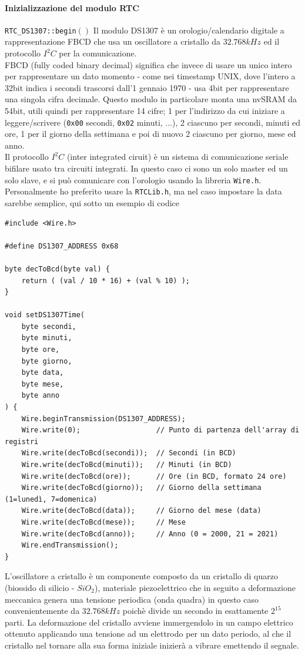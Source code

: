 \documentclass{article}
\begin{document}
    \paragraph{Inizializzazione del modulo RTC} \texttt{RTC\_DS1307::begin$()$} Il modulo DS1307 è un orologio/calendario digitale a rappresentazione FBCD che usa un oscillatore a cristallo da $32.768kHz$ ed il protocollo $I^{2}C$ per la comunicazione. \\
    FBCD (fully coded binary decimal) significa che invece di usare un unico intero per rappresentare un dato momento - come nei timestamp UNIX, dove l'intero a 32bit indica i secondi trascorsi dall'1 gennaio 1970 - usa 4bit per rappresentare una singola cifra decimale. Questo modulo in particolare monta una nvSRAM da 54bit, utili quindi per rappresentare 14 cifre; 1 per l'indirizzo da cui iniziare a leggere/scrivere (\texttt{0x00} secondi, \texttt{0x02} minuti, ...), 2 ciascuno per secondi, minuti ed ore, 1 per il giorno della settimana e poi di nuovo 2 ciascuno per giorno, mese ed anno. \\
    Il protocollo $I^{2}C$ (inter integrated ciruit) è un sistema di comunicazione seriale bifilare usato tra circuiti integrati. In questo caso ci sono un solo master ed un solo slave, e si può comunicare con l'orologio usando la libreria \texttt{Wire.h}. Personalmente ho preferito usare la \texttt{RTCLib.h}, ma nel caso impostare la data sarebbe semplice, qui sotto un esempio di codice
    \begin{verbatim}
#include <Wire.h>

#define DS1307_ADDRESS 0x68

byte decToBcd(byte val) {
    return ( (val / 10 * 16) + (val % 10) );
}

void setDS1307Time(
    byte secondi, 
    byte minuti, 
    byte ore, 
    byte giorno, 
    byte data, 
    byte mese, 
    byte anno
) {
    Wire.beginTransmission(DS1307_ADDRESS);
    Wire.write(0);                  // Punto di partenza dell'array di registri
    Wire.write(decToBcd(secondi));  // Secondi (in BCD)
    Wire.write(decToBcd(minuti));   // Minuti (in BCD)
    Wire.write(decToBcd(ore));      // Ore (in BCD, formato 24 ore)
    Wire.write(decToBcd(giorno));   // Giorno della settimana (1=lunedì, 7=domenica)
    Wire.write(decToBcd(data));     // Giorno del mese (data)
    Wire.write(decToBcd(mese));     // Mese
    Wire.write(decToBcd(anno));     // Anno (0 = 2000, 21 = 2021)
    Wire.endTransmission();
}
    \end{verbatim}
    L'oscillatore a cristallo è un componente composto da un cristallo di quarzo (biossido di silicio - $SiO_{2}$), materiale piezoelettrico che in seguito a deformazione meccanica genera una tensione periodica (onda quadra) in questo caso convenientemente da $32.768kHz$ poichè divide un secondo in esattamente $2^{15}$ parti. La deformazione del cristallo avviene immergendolo in un campo elettrico ottenuto applicando una tensione ad un elettrodo per un dato periodo, al che il cristallo nel tornare alla sua forma iniziale inizierà a vibrare emettendo il segnale.  
\end{document}
